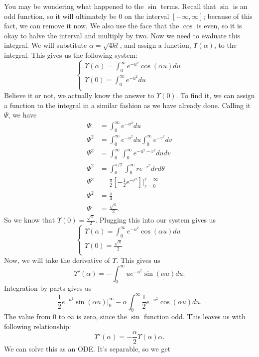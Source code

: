 You may be wondering what happened to the $\sin$ terms. Recall that $\sin$ is an odd function, so it will ultimately be $0$ on the interval $[-\infty,\infty]$; because of this fact, we can remove it now. We also use the face that the $\cos$ is even, so it is okay to halve the interval and multiply by two. Now we need to evaluate this integral. We will substitute $\alpha = \sqrt{4kt}$, and assign a function, $\Upsilon(\alpha)$, to the integral. This gives us the following system:
\[
\begin{cases}
\Upsilon(\alpha) = \int_{0}^{\infty}e^{-u^{2}}\cos{(\alpha u)}du\\
\Upsilon(0) = \int_{0}^{\infty}e^{-u^{2}}du\\
\end{cases}
\]
Believe it or not, we actually know the answer to $\Upsilon(0)$. To find it, we can assign a function to the integral in a similar fashion as we have already done. Calling it $\Psi$, we have
\begin{align*}
\Psi &= \int_{0}^{\infty}e^{-u^{2}}du\\
\Psi^{2} &= \int_{0}^{\infty}e^{-u^{2}}du \int_{0}^{\infty}e^{-v^{2}}dv\\
\Psi^{2} &= \int_{0}^{\infty}\int_{0}^{\infty}e^{-u^{2}-v^{2}}dudv\\
\Psi^{2} &= \int_{0}^{\pi/2}\int_{0}^{\infty}re^{-r^{2}}drd\theta\\
\Psi^{2} &= \frac{\pi}{2}\left[-\frac{1}{2}e^{-r^{2}}\right]\Bigg |_{r=0}^{r=\infty}\\
\Psi^{2} &= \frac{\pi}{4}\\
\Psi &= \frac{\sqrt{\pi}}{2}.
\end{align*}
So we know that $\Upsilon(0) = \frac{\sqrt{\pi}}{2}$. Plugging this into our system gives us
\[
\begin{cases}
\Upsilon(\alpha) = \int_{0}^{\infty}e^{-u^{2}}\cos{(\alpha u)}du\\
\Upsilon(0) = \frac{\sqrt{\pi}}{2}\\
\end{cases}
\]
Now, we will take the derivative of $\Upsilon$. This gives us
\[
\Upsilon'(\alpha) = -\int_{0}^{\infty}ue^{-u^{2}}\sin{(\alpha u)}du.
\]
Integration by parts gives us
\[
\frac{1}{2}e^{-u^{2}}\sin{(\alpha u)}\Big |_{0}^{\infty} - \alpha\int_{0}^{\infty}\frac{1}{2}e^{-u^{2}}\cos{(\alpha u)}du.
\]
The value from $0$ to $\infty$ is zero, since the $\sin$ function odd. This leaves us with following relationship:
\[
\Upsilon'(\alpha) = -\frac{\alpha}{2}\Upsilon(\alpha) \alpha.
\]
We can solve this as an ODE. It's separable, so we get
